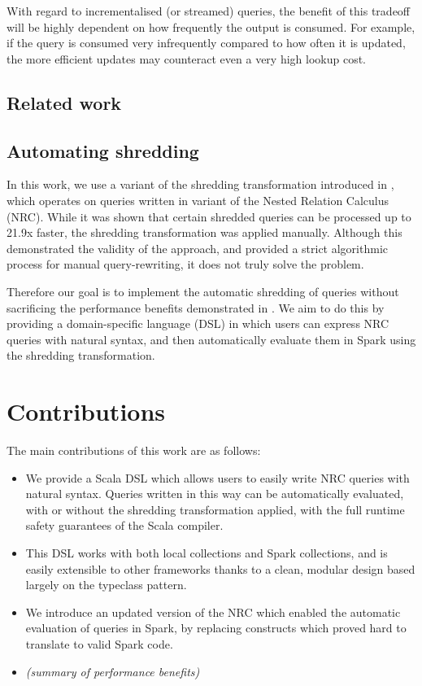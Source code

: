 {With regard to incrementalised (or streamed) queries, the benefit of this tradeoff will be highly dependent on how frequently the output is consumed. For example, if the query is consumed very infrequently compared to how often it is updated, the more efficient updates may counteract even a very high lookup cost.

\subsection{Related work} {}

\subsection{Automating shredding} {
In this work, we use a variant of the shredding transformation introduced in \cite{draftpaper}, which operates on queries written in variant of the Nested Relation Calculus (NRC). While it was shown that certain shredded queries can be processed up to 21.9x faster, the shredding transformation was applied manually. Although this demonstrated the validity of the approach, and provided a strict algorithmic process for manual query-rewriting, it does not truly solve the problem.

Therefore our goal is to implement the automatic shredding of queries without sacrificing the performance benefits demonstrated in \cite{draftpaper}. We aim to do this by providing a domain-specific language (DSL) in which users can express NRC queries with natural syntax, and then automatically evaluate them in Spark using the shredding transformation.
}

}


\section{Contributions} {
The main contributions of this work are as follows:

\begin{itemize}
\item{We provide a Scala DSL which allows users to easily write NRC queries with natural syntax. Queries written in this way can be automatically evaluated, with or without the shredding transformation applied, with the full runtime safety guarantees of the Scala compiler.}
\item{This DSL works with both local collections and Spark collections, and is easily extensible to other frameworks thanks to a clean, modular design based largely on the typeclass pattern.}
\item{We introduce an updated version of the NRC which enabled the automatic evaluation of queries in Spark, by replacing constructs which proved hard to translate to valid Spark code.}
\item{\textit{(summary of performance benefits)}}
\end{itemize}
}

